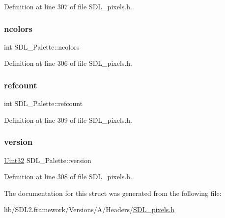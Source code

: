 Definition at line 307 of file S\+D\+L\+\_\+pixels.\+h.

\mbox{\label{struct_s_d_l___palette_a81a0cc3197480e994c6b06f1f0567091}} 
\subsubsection{\texorpdfstring{ncolors}{ncolors}}
{\footnotesize\ttfamily int S\+D\+L\+\_\+\+Palette\+::ncolors}



Definition at line 306 of file S\+D\+L\+\_\+pixels.\+h.

\mbox{\label{struct_s_d_l___palette_a35c667737f883f973bb0a8dea143b08d}} 
\subsubsection{\texorpdfstring{refcount}{refcount}}
{\footnotesize\ttfamily int S\+D\+L\+\_\+\+Palette\+::refcount}



Definition at line 309 of file S\+D\+L\+\_\+pixels.\+h.

\mbox{\label{struct_s_d_l___palette_a5b8d45519f6850a32f13f1602ce37a8e}} 
\subsubsection{\texorpdfstring{version}{version}}
{\footnotesize\ttfamily \mbox{\hyperlink{_s_d_l__stdinc_8h_add440eff171ea5f55cb00c4a9ab8672d}{Uint32}} S\+D\+L\+\_\+\+Palette\+::version}



Definition at line 308 of file S\+D\+L\+\_\+pixels.\+h.



The documentation for this struct was generated from the following file\+:\begin{DoxyCompactItemize}
\item 
lib/\+S\+D\+L2.\+framework/\+Versions/\+A/\+Headers/\mbox{\hyperlink{_s_d_l__pixels_8h}{S\+D\+L\+\_\+pixels.\+h}}\end{DoxyCompactItemize}
